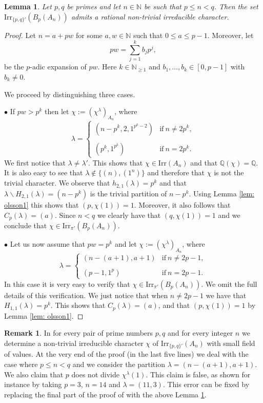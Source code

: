 \documentclass[a4paper,12pt,leqno]{amsart}
\newcommand{\6}{^}
\newtheorem{lem}[subsection]{Lemma}
\theoremstyle{definition}
\newtheorem{rem}[subsection]{Remark}
\theoremstyle{definition}
\theoremstyle{definition}
\theoremstyle{definition}
\theoremstyle{definition}
\begin{document}
\begin{lem}\label{alterna q more than n}
Let $p,q$ be primes and let $n\in\mathbb{N}$ be such that $p\leq n<q$. Then the set $\mathrm{Irr}_{\{p,q\}'}(B_p(A_n))$ admits a rational non-trivial irreducible character.
\end{lem}
\begin{proof}
Let $n=a+pw$ for some $a,w\in\mathbb{N}$ such that $0\leq a\leq p-1$. Moreover, let 
$$pw=\sum_{j=1}\6kb_jp\6{j},$$
be the $p$-adic expansion of $pw$. Here $k\in\mathbb{N}_{\geq 1}$ and $b_1,\ldots, b_k\in [0,p-1]$ with $b_k\neq 0$.

We proceed by distinguishing three cases. 

\noindent$\bullet$ If $pw>p\6k$ then let $\chi:=(\chi\6\lambda)_{A_n}$, where 
$$\lambda=\begin{cases} (n-p\6k,2, 1\6{p\6k-2}) & \mathrm{if}\ n\neq 2p\6k,\\
\\
(p\6k, 1\6{p\6k}) & \mathrm{if}\ n=2p\6k.
\end{cases}
$$
We first notice that $\lambda\neq\lambda'$. This shows that $\chi\in\mathrm{Irr}(A_n)$ and that $\mathbb{Q}(\chi)=\mathbb{Q}$. It is also easy to see that $\lambda\notin\{(n), (1\6n)\}$ and therefore that $\chi$ is not the trivial character. We observe that
$h_{2,1}(\lambda)=p\6k$ and that $\lambda\smallsetminus H_{2,1}(\lambda)=(n-p\6k)$ is the trivial partition of $n-p\6k$. Using Lemma \ref{lem: olsson1} this shows that $(p,\chi(1))=1$. Moreover, it also follows that $C_p(\lambda)=(a)$. Since $n<q$ we clearly have that $(q,\chi(1))=1$ and we conclude that $\chi\in\mathrm{Irr}_{\pi'}(B_p(A_n))$. 

\noindent$\bullet$ Let us now assume that $pw=p\6k$ and let $\chi:=(\chi\6\lambda)_{A_n}$, where 
$$\lambda=\begin{cases} (n-(a+1), a+1) & \mathrm{if}\ n\neq 2p-1,\\
\\
(p-1, 1\6{p}) & \mathrm{if}\ n=2p-1.
\end{cases}
$$
In this case it is very easy to verify that $\chi\in\mathrm{Irr}_{\pi'}(B_p(A_n))$. We omit the full details of this verification. We just notice that when $n\neq 2p-1$ we have that $H_{1,1}(\lambda)=p\6k$. This shows that $C_p(\lambda)=(a)$, and that $(p,\chi(1))=1$ by Lemma \ref{lem: olsson1}. 
\end{proof}

\begin{rem}\label{rem: error}
In \cite[Theorem D]{GHSV21} for every pair of prime numbers $p,q$ and for every integer $n$ we determine a non-trivial irreducible character $\chi$ of $\mathrm{Irr}_{\{p,q\}'}(A_n)$ with small field of values. At the very end of the proof (in the last five lines) we deal with the case where $p\leq n<q$ and we consider the partition $\lambda=(n-(a+1),a+1)$. We also claim that $p$ does not divide $\chi\6\lambda(1)$. This claim is false, as shown for instance by taking $p=3$, $n=14$ and $\lambda=(11,3)$. 
This error can be fixed by replacing the final part of the proof of \cite[Theorem D]{GHSV21} with the above 
Lemma \ref{alterna q more than n}.
\end{rem}
\end{document}
